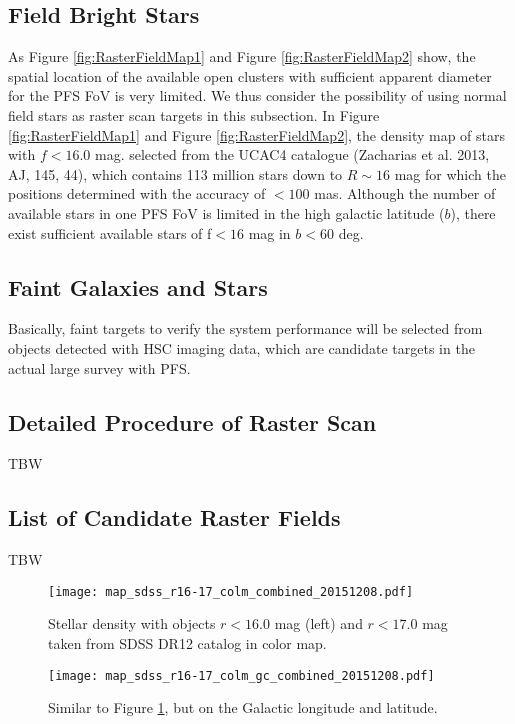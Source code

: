 \subsection{Field Bright Stars}
As Figure \ref{fig:RasterFieldMap1} and Figure \ref{fig:RasterFieldMap2} show, the spatial location of the available open clusters with sufficient apparent diameter for the PFS FoV is very limited. We thus consider the possibility of using normal field stars as raster scan targets in this subsection. In Figure \ref{fig:RasterFieldMap1} and Figure \ref{fig:RasterFieldMap2}, the density map of stars with $f<16.0$ mag. selected from the UCAC4 catalogue (Zacharias et al. 2013, AJ, 145, 44), which contains 113 million stars down to $R\sim16$ mag for which the positions determined with the accuracy of $<100$ mas. Although the number of available stars in one PFS FoV is limited in the high galactic latitude ($b$), there exist sufficient available stars of f$<16$ mag in $b<60$ deg.

\subsection{Faint Galaxies and Stars}
Basically, faint targets to verify the system performance will be selected from objects detected with HSC imaging data, which are candidate targets in the actual large survey with PFS. 


\subsection{Detailed Procedure of Raster Scan}
TBW

\subsection{List of Candidate Raster Fields}
TBW

\begin{figure}[!ht]
\begin{center}
\texttt{[image: map\_sdss\_r16-17\_colm\_combined\_20151208.pdf]}
\end{center}
\caption{Stellar density with objects $r<16.0$ mag (left) and $r<17.0$ mag taken from SDSS DR12 catalog in color map. 
}
\label{fig:RasterFieldMapSDSS1}
\end{figure}

\begin{figure}[!ht]
\begin{center}
\texttt{[image: map\_sdss\_r16-17\_colm\_gc\_combined\_20151208.pdf]}
\end{center}
\caption{Similar to Figure \ref{fig:RasterFieldMapSDSS1}, but on the Galactic longitude and latitude.
}
\label{fig:RasterFieldMapSDSS2}
\end{figure}
